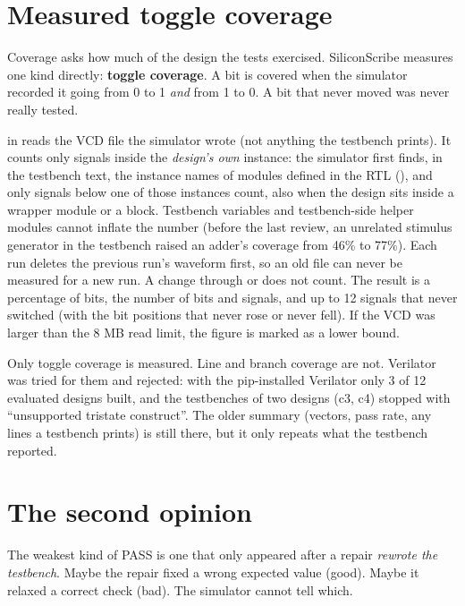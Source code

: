 \section{Measured toggle coverage}
\label{sec:toggle}

Coverage asks how much of the design the tests exercised. SiliconScribe measures one kind directly: \textbf{toggle coverage}. A bit is covered when the simulator recorded it going from 0 to 1 \emph{and} from 1 to 0. A bit that never moved was never really tested.

 in  reads the VCD file the simulator wrote (not anything the testbench prints). It counts only signals inside the \emph{design's own} instance: the simulator first finds, in the testbench text, the instance names of modules defined in the RTL (), and only signals below one of those instances count, also when the design sits inside a wrapper module or a  block. Testbench variables and testbench-side helper modules cannot inflate the number (before the last review, an unrelated stimulus generator in the testbench raised an adder's coverage from 46\% to 77\%). Each run deletes the previous run's waveform first, so an old file can never be measured for a new run. A change through  or  does not count. The result is a percentage of bits, the number of bits and signals, and up to 12 signals that never switched (with the bit positions that never rose or never fell). If the VCD was larger than the 8 MB read limit, the figure is marked as a lower bound.

\begin{warnbox}
Only toggle coverage is measured. Line and branch coverage are not. Verilator was tried for them and rejected: with the pip-installed Verilator only 3 of 12 evaluated designs built, and the testbenches of two designs (c3, c4) stopped with ``unsupported tristate construct''. The older  summary (vectors, pass rate, any  lines a testbench prints) is still there, but it only repeats what the testbench reported.
\end{warnbox}

\section{The second opinion}
\label{sec:secondopinion}

The weakest kind of PASS is one that only appeared after a repair \emph{rewrote the testbench}. Maybe the repair fixed a wrong expected value (good). Maybe it relaxed a correct check (bad). The simulator cannot tell which.

